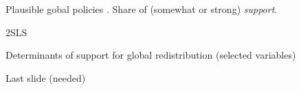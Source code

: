 \documentclass[aspectratio=169,xcolor=dvipsnames, 11pt,mathserif]{beamer}
\begin{document}
\begin{frame}{Plausible gobal policies\label{solidarity_support_absolute} .\hyperlink{solidarity_support_relative}{}}
\centering Share of (somewhat or strong) \textit{support}. \\
\end{frame}


\begin{frame}{2SLS\label{2SLS}  \hyperlink{warm_glow}{}}  
  \small 
\end{frame}

\begin{frame}{Determinants of support for global redistribution (selected variables)\label{determinants}  \hyperlink{gcs}{}}  
      \vspace{-.18cm}
    \begin{table}[h]
        \makebox[\textwidth][c]{
            \resizebox*{!}{.97\textheight}{
            
            }
        }
    \end{table} 
\end{frame}

\begin{frame}{Last slide (needed)}
  \end{frame}
\end{document}
